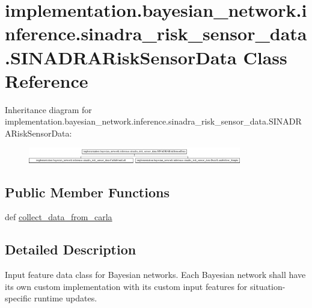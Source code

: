 \hypertarget{classimplementation_1_1bayesian__network_1_1inference_1_1sinadra__risk__sensor__data_1_1_s_i_n_a_d_r_a_risk_sensor_data}{}\section{implementation.\+bayesian\+\_\+network.\+inference.\+sinadra\+\_\+risk\+\_\+sensor\+\_\+data.\+S\+I\+N\+A\+D\+R\+A\+Risk\+Sensor\+Data Class Reference}
\label{classimplementation_1_1bayesian__network_1_1inference_1_1sinadra__risk__sensor__data_1_1_s_i_n_a_d_r_a_risk_sensor_data}
Inheritance diagram for implementation.\+bayesian\+\_\+network.\+inference.\+sinadra\+\_\+risk\+\_\+sensor\+\_\+data.\+S\+I\+N\+A\+D\+R\+A\+Risk\+Sensor\+Data\+:\begin{figure}[H]
\begin{center}
\leavevmode
\includegraphics[height=0.663114cm]{classimplementation_1_1bayesian__network_1_1inference_1_1sinadra__risk__sensor__data_1_1_s_i_n_a_d_r_a_risk_sensor_data}
\end{center}
\end{figure}
\subsection*{Public Member Functions}
\begin{DoxyCompactItemize}
\item 
def \hyperlink{classimplementation_1_1bayesian__network_1_1inference_1_1sinadra__risk__sensor__data_1_1_s_i_n_a_d_r_a_risk_sensor_data_a554eb2647b96b3956764d60ecdec2425}{collect\+\_\+data\+\_\+from\+\_\+carla}
\end{DoxyCompactItemize}


\subsection{Detailed Description}
\begin{DoxyVerb}Input feature data class for Bayesian networks. Each Bayesian network shall have its own custom implementation
with its custom input features for situation-specific runtime updates.
\end{DoxyVerb}
 

